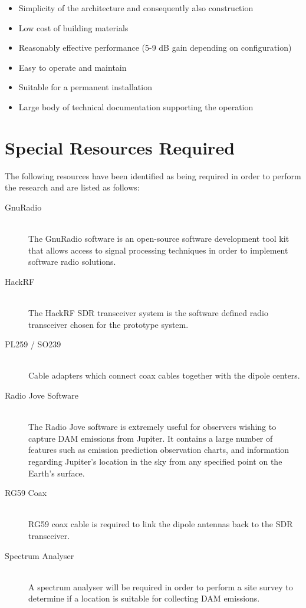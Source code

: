 \documentclass[runningheads,a4paper]{llncs}
\begin{document}
\begin{itemize}
	\item Simplicity of the architecture and consequently also construction
	\item Low cost of building materials
	\item Reasonably effective performance (5-9 dB gain depending on configuration)
	\item Easy to operate and maintain
	\item Suitable for a permanent installation
	\item Large body of technical documentation supporting the operation
\end{itemize}


\section*{Special Resources Required}

The following resources have been identified as being required in order to perform the research and are listed as follows:

\begin{description}
  \item[GnuRadio] \hfill \\
  The GnuRadio software is an open-source software development tool kit that allows access to signal processing techniques in order to implement software radio solutions.
  \item[HackRF] \hfill \\
  The HackRF \gls{SDR} transceiver system is the software defined radio transceiver chosen for the prototype system.
  \item[PL259 / SO239] \hfill \\
  Cable adapters which connect coax cables together with the dipole centers.
  \item[Radio Jove Software] \hfill \\
  The Radio Jove software is extremely useful for observers wishing to capture \gls{DAM} emissions from Jupiter. It contains a large number of features such as emission prediction observation charts, and information regarding Jupiter's location in the sky from any specified point on the Earth's surface.
  \item[RG59 Coax] \hfill \\
  RG59 coax cable is required to link the dipole antennas back to the \gls{SDR} transceiver.
  \item[Spectrum Analyser] \hfill \\
  A spectrum analyser will be required in order to perform a site survey to determine if a location is suitable for collecting \gls{DAM} emissions.
\end{description}
\end{document}
